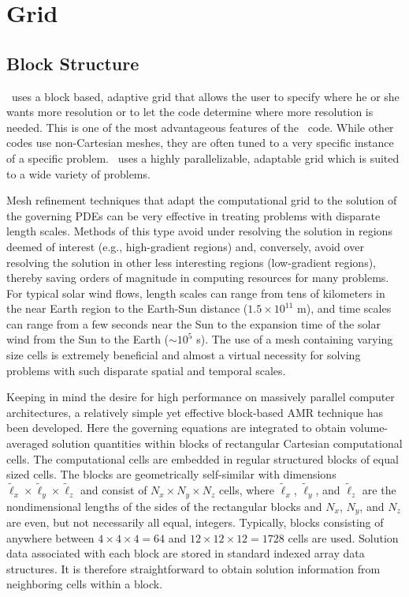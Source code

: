 \section{Grid \label{section:grid}}
\subsection{Block Structure \label{section:blocks}}

\BATSRUS\ uses a block based, adaptive grid that allows the user to
specify where he or she wants more resolution or to let the code
determine where more resolution is needed.  This is one of the
most advantageous features of the \BATSRUS\ code.  While other codes
use non-Cartesian meshes, they are often tuned to a
very specific instance of a specific problem.  \BATSRUS\ uses
a highly parallelizable, adaptable grid which is suited to a wide 
variety of problems.

Mesh refinement techniques that adapt the computational
grid to the solution of the governing PDEs can be very effective in treating
problems with disparate length scales.   Methods of this type avoid
under resolving the solution in regions deemed of interest (e.g., high-gradient
regions) and, conversely, avoid over resolving the solution in other less
interesting regions (low-gradient regions), thereby saving orders of
magnitude in computing resources for many problems.  For typical solar wind
flows, length scales can range from tens of kilometers in the near Earth region
to the Earth-Sun distance ($1.5\times10^{11}$ m), and time scales can range from
a few seconds near the Sun to the expansion time of the solar wind from the Sun
to the Earth ($\sim$$10 ^5$ s).  The use of a mesh containing varying
size cells is extremely beneficial and
almost a virtual necessity for solving problems with such disparate spatial and
temporal scales.

Keeping in mind
the desire for high performance on massively parallel computer architectures, a
relatively simple yet effective block-based AMR technique has been developed.
Here the governing equations are
integrated to obtain volume-averaged solution quantities within blocks
of rectangular Cartesian computational cells.  
The computational cells are embedded
in regular structured blocks of equal sized cells.  The blocks are
geometrically self-similar with dimensions $\tilde{\ell}_x \times
\tilde{\ell}_y \times \tilde{\ell}_z$ and consist of $N_x \times N_y \times
N_z$ cells, where $\tilde{\ell}_x$, $\tilde{\ell}_y$, and $\tilde{\ell}_z$ are
the nondimensional lengths of the sides of the rectangular blocks and $N_x$,
$N_y$, and $N_z$ are even, but not necessarily all equal, integers. Typically,
blocks consisting of anywhere between $4 \times 4 \times 4 = 64$ and $12 \times
12 \times 12 = 1728$ cells are used.  Solution
data associated with each block are stored in standard indexed array data
structures.  It is therefore straightforward to obtain solution information
from neighboring cells within a block.

